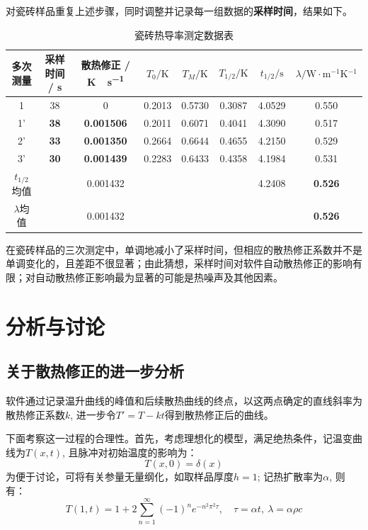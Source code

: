 \documentclass[a4paper,11pt]{article}
\begin{document}
	对瓷砖样品重复上述步骤，同时调整并记录每一组数据的\textbf{采样时间}，结果如下。
	\begin{table}[H]
	\centering\caption{瓷砖热导率测定数据表}
	\small
	\begin{tabularx}{\linewidth}
		{C{.55} C{.75} C{1} *4{C{.35}} C{.75}}
	\toprule
		\footnotesize 多次测量 &
		\footnotesize 采样时间 / \si{\s} &
		\footnotesize 散热修正 / \si{\kelvin\cdot\s^{-1}} &
		$T_0 / \si{\kelvin}$ &
		$T_M / \si{\kelvin}$ &
		$T_{1/2} / \si{\kelvin}$ &
		$t_{1/2} / \si{\s}$ &
		\footnotesize $\lambda / \si{\watt\cdot\m^{-1}\K^{-1}}$ \\
	     & 38  & 0     & 0.2013 & 0.5730 & 0.3087 & 4.0529 & 0.550 \\
	'    & \bfseries 38  & \bfseries 0.001506 & 0.2011 & 0.6071 & 0.4041 & 4.3090 & 0.517 \\
		2'    & \bfseries 33    & \bfseries 0.001350 & 0.2664 & 0.6644 & 0.4655 & 4.2150 & 0.529 \\
		3'    & \bfseries 30    & \bfseries 0.001439 & 0.2283 & 0.6433 & 0.4358 & 4.1984 & 0.531 \\
		$t_{1/2}$均值   &       & 0.001432 &       &       &       & 4.2408 & \bfseries 0.526 \\
		$\lambda$均值 &       & 0.001432 &       &       &       &       & \bfseries 0.526 \\
	\bottomrule
	\end{tabularx}
	\end{table}
	
	在瓷砖样品的三次测定中，单调地减小了采样时间，但相应的散热修正系数并不是单调变化的，且差距不很显著；由此猜想，采样时间对软件自动散热修正的影响有限；对自动散热修正影响最为显著的可能是热噪声及其他因素。
\section{分析与讨论}
\subsection{关于散热修正的进一步分析}
	软件通过记录温升曲线的峰值和后续散热曲线的终点，以这两点确定的直线斜率为散热修正系数$k$, 进一步令$T' = T - kt$得到散热修正后的曲线。
	
	下面考察这一过程的合理性。首先，考虑理想化的模型，满足绝热条件，记温变曲线为$T(x,t)$, 且脉冲对初始温度的影响为：
	\begin{equation}
		T(x,0) = \delta(x)
	\end{equation}
	为便于讨论，可将有关参量无量纲化，如取样品厚度$h = 1$; 记热扩散率为$\alpha$, 则有：
	\begin{equation}
		T(1,t) = 1 + 2\sum_{n=1}^{\infty}
			(-1)^n e^{-n^2\pi^2\tau},\quad
		\tau = \alpha t,\ 
		\lambda = \alpha\rho c
	\end{equation}
\pagebreak
	
\end{document}
